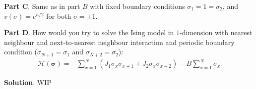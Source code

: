 \documentclass[../template.tex]{subfiles}
\begin{document}
\begin{exo}
    \medskip

    \textbf{Part C}. Same as in part $B$ with fixed boundary conditions $\sigma_1 = 1 = \sigma_2$, and $v(\sigma) = e^{h/2}$ for both $\sigma=\pm 1$.
    
    \medskip

    \textbf{Part D}. How would you try to solve the Ising model in $1$-dimension with nearest neighbour and next-to-nearest neighbour interaction and periodic boundary condition ($\sigma_{N+1} = \sigma_1$ and $\sigma_{N+2} = \sigma_2$):
    \begin{align*}
        \mathcal{H}(\bm{\sigma}) = -\sum_{x=1}^N (J_1 \sigma_x \sigma_{x+1} + J_2 \sigma_x \sigma_{x+2}) - B \sum_{x=1}^N \sigma_x
    \end{align*} 

    \medskip

    \textbf{Solution}. WIP %
     
\end{exo}
\end{document}
